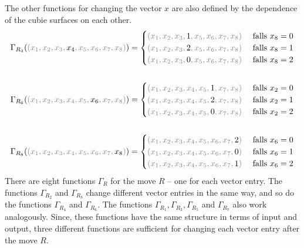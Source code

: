 \documentclass[12pt,a4paper]{article}
\theoremstyle{custom}
\begin{document}
The other functions for changing the vector $x$ are also defined by the dependence of the cubie surfaces on each other.
\begin{align*}
\Gamma_{R_4}(\textcolor{gray}{(x_1, x_2, x_3, \textcolor{black}{x_4}, x_5, x_6, x_7, x_8  )})= \begin{cases}
\textcolor{gray}{(x_1, x_2, x_3, \textcolor{black}{1}, x_5, x_6, x_7, x_8  )} & \ \text{falls } x_8 = 0 \\ 
\textcolor{gray}{(x_1, x_2, x_3, \textcolor{black}{2}, x_5, x_6, x_7, x_8  )} & \ \text{falls } x_8 = 1 \\
\textcolor{gray}{(x_1, x_2, x_3, \textcolor{black}{0}, x_5, x_6, x_7, x_8  )} & \ \text{falls } x_8 = 2 
\end{cases} \\
\\
\Gamma_{R_6}(\textcolor{gray}{(x_1, x_2, x_3, x_4, x_5, \textcolor{black}{x_6}, x_7, x_8  )})= \begin{cases}
\textcolor{gray}{(x_1, x_2, x_3, x_4, x_5, \textcolor{black}{1}, x_7, x_8  )} & \ \text{falls } x_2 = 0 \\ 
\textcolor{gray}{(x_1, x_2, x_3, x_4, x_5, \textcolor{black}{2}, x_7, x_8  )} & \ \text{falls } x_2 = 1 \\
\textcolor{gray}{(x_1, x_2, x_3, x_4, x_5, \textcolor{black}{0}, x_7, x_8  )} & \ \text{falls } x_2 = 2 
\end{cases} \\
\\
\Gamma_{R_8}(\textcolor{gray}{(x_1, x_2, x_3, x_4, x_5, x_6, x_7, \textcolor{black}{x_8})})= \begin{cases}
\textcolor{gray}{(x_1, x_2, x_3, x_4, x_5, x_6, x_7, \textcolor{black}{2})} & \ \text{falls } x_6 = 0 \\ 
\textcolor{gray}{(x_1, x_2, x_3, x_4, x_5, x_6, x_7, \textcolor{black}{0})} & \ \text{falls } x_6 = 1 \\
\textcolor{gray}{(x_1, x_2, x_3, x_4, x_5, x_6, x_7, \textcolor{black}{1})} & \ \text{falls } x_6 = 2 
\end{cases}
\end{align*}
There are eight functions $\Gamma_R$ for the move $R$ -- one for each vector entry. The functions $\Gamma_{R_2}$ and $\Gamma_{R_8}$ change different vector entries in the same way, and so do the functions $\Gamma_{R_4}$ and $\Gamma_{R_6}$. The functions $\Gamma_{R_1}, \Gamma_{R_3}, \Gamma_{R_5}$ and $\Gamma_{R_7}$ also work analogously. Since, these functions have the same structure in terms of input and output, three different functions are sufficient for changing each vector entry after the move $R$.
\\
\end{document}
